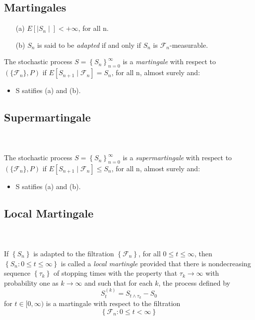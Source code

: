 \subsection{Martingales}
\begin{itemize}
\item[(a)] $E[ \mid S_{n}\mid]< +\infty$, for all n.
\item[(b)] $S_n$ is said to be \textit{adapted} if and only if $S_{n}$ is $\mathcal{F}_{n}$-measurable. 
\end{itemize} 
The stochastic process $S = \displaystyle{\left\lbrace S_n \right\rbrace_{n=0}^\infty}$ is a \textit{martingale} with
respect to $\left( \lbrace\mathcal{F}_{n}\rbrace, P \right)$  if $E[ S_{n+1}\mid \mathcal{F}_{n}] = S_{n}$, for all n,
almost surely and:
  \begin{itemize}
  \item S satifies (a) and (b).
  \end{itemize}
\subsection{Supermartingale}\\\\
The stochastic process $S = \displaystyle{\left\lbrace S_n \right\rbrace_{n=0}^\infty}$ is a \textit{supermartingale}
with respect to $\left( \lbrace\mathcal{F}_{n}\rbrace, P \right)$  if $E[ S_{n+1}\mid \mathcal{F}_{n}] \leq S_{n}$, for
all n, almost surely and:
  \begin{itemize}
  \item S satifies (a) and (b).
  \end{itemize}
 \subsection{Local Martingale}\\\\
If $\left\lbrace S_n \right\rbrace$ is adapted to the filtration $\left\lbrace \mathcal{F}_n \right\rbrace $, for all $0
\leq t\leq \infty$, then $\left\lbrace S_n: 0 \leq t \leq \infty \right\rbrace$ is called a \textit{local martingle}
provided that there is nondecreasing sequence $\left\lbrace \tau_k \right\rbrace $ of stopping times with the property
that $\tau_k \rightarrow \infty$ with probability one as $k \rightarrow \infty$ and such that for each $k$, the process
defined by
$$S_t^{(k)} = S_{t \wedge \tau_k} - S_0$$ for $t \in [0 , \infty)$ is a martingale with respect to the filtration
$$\left\lbrace \mathcal{F}_n : 0 \leq t < \infty \right\rbrace$$
